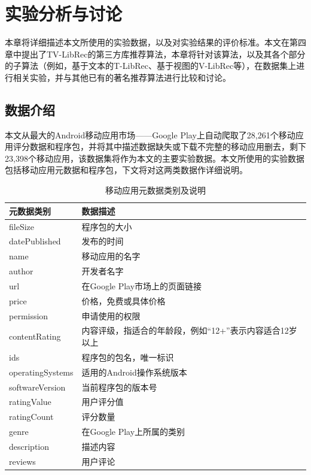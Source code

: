 \chapter{实验分析与讨论}
本章将详细描述本文所使用的实验数据，以及对实验结果的评价标准。本文在第四章中提出了TV-LibRec的第三方库推荐算法，本章将针对该算法，以及其各个部分的子算法（例如，基于文本的T-LibRec、基于视图的V-LibRec等），在数据集上进行相关实验，并与其他已有的著名推荐算法进行比较和讨论。


\section{数据介绍}
本文从最大的Android移动应用市场——Google Play上自动爬取了28,261个移动应用评分数据和程序包，并将其中描述数据缺失或下载不完整的移动应用删去，剩下23,398个移动应用，该数据集将作为本文的主要实验数据。本文所使用的实验数据包括移动应用元数据和程序包，下文将对这两类数据作详细说明。


\begin{table}
\centering
\caption{移动应用元数据类别及说明}
\begin{tabular}{|C{1.8in}|C{3.3in}|}
\hline
\textbf{元数据类别} & \textbf{数据描述} \\ \hline\hline
fileSize & 程序包的大小 \\ \hline
datePublished & 发布的时间 \\ \hline
name & 移动应用的名字 \\ \hline
author & 开发者名字 \\ \hline
url & 在Google Play市场上的页面链接 \\ \hline
price & 价格，免费或具体价格 \\ \hline
permission & 申请使用的权限 \\ \hline
contentRating & 内容评级，指适合的年龄段，例如“12+”表示内容适合12岁以上 \\ \hline
ids & 程序包的包名，唯一标识 \\ \hline
operatingSystems & 适用的Android操作系统版本 \\ \hline
softwareVersion & 当前程序包的版本号 \\ \hline
ratingValue & 用户评分值 \\ \hline
ratingCount & 评分数量 \\ \hline
genre & 在Google Play上所属的类别 \\ \hline
description & 描述内容 \\ \hline
reviews & 用户评论 \\ \hline
\end{tabular}
\end{table}

